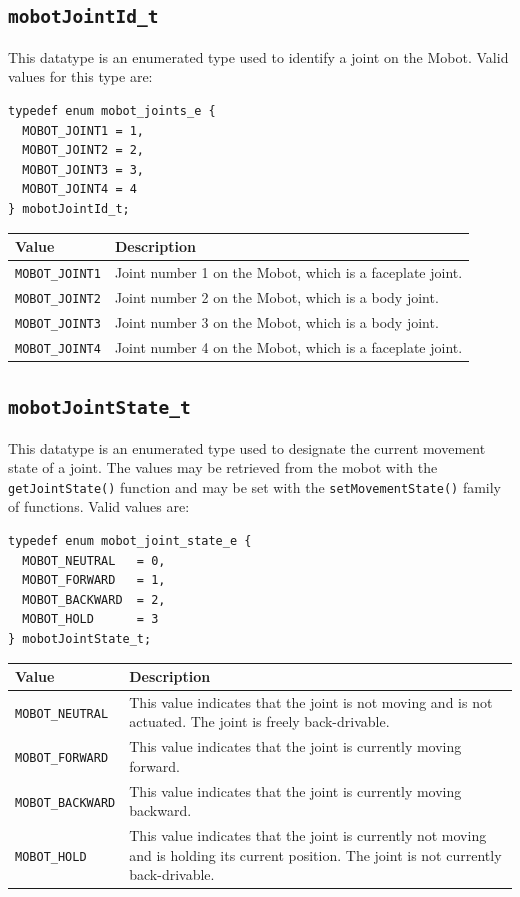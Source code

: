 \documentclass{article}
\begin{document}
\subsection{\label{sec:mobotJointId_t}\texttt{mobotJointId\_t}}
This datatype is an enumerated type used to identify a joint on the Mobot. Valid
values for this type are:
\begin{verbatim}
typedef enum mobot_joints_e {
  MOBOT_JOINT1 = 1,
  MOBOT_JOINT2 = 2,
  MOBOT_JOINT3 = 3,
  MOBOT_JOINT4 = 4
} mobotJointId_t;
\end{verbatim}

\begin{tabular}{p{3cm}p{10cm}} \hline 
Value & Description \\
\hline 
\texttt{MOBOT\_JOINT1} & Joint number 1 on the Mobot, which is a faceplate joint. \\
\texttt{MOBOT\_JOINT2} & Joint number 2 on the Mobot, which is a body joint. \\
\texttt{MOBOT\_JOINT3} & Joint number 3 on the Mobot, which is a body joint. \\
\texttt{MOBOT\_JOINT4} & Joint number 4 on the Mobot, which is a faceplate joint. \\
\hline
\end{tabular}

\subsection{\label{sec:mobotJointState_t}\texttt{mobotJointState\_t}}
This datatype is an enumerated type used to designate the current 
movement state of a joint. The values may be retrieved from the 
mobot with the \texttt{getJointState()} function and may be set 
with the \texttt{setMovementState()} family of functions. Valid values are:

\begin{verbatim}
typedef enum mobot_joint_state_e {
  MOBOT_NEUTRAL   = 0,
  MOBOT_FORWARD   = 1,
  MOBOT_BACKWARD  = 2,
  MOBOT_HOLD      = 3
} mobotJointState_t;
\end{verbatim}

\begin{tabular}{p{3.3cm}p{11.5cm}} \hline 
Value & Description \\
\hline
\texttt{MOBOT\_NEUTRAL}& This value indicates that the joint is not moving and is not actuated. The joint is freely back-drivable. \\
\texttt{MOBOT\_FORWARD}& This value indicates that the joint is currently moving forward. \\
\texttt{MOBOT\_BACKWARD}& This value indicates that the joint is currently moving backward. \\
\texttt{MOBOT\_HOLD}& This value indicates that the joint is currently not moving and is holding its current position. The joint is not currently back-drivable. \\
\hline
\end{tabular}
\end{document}
